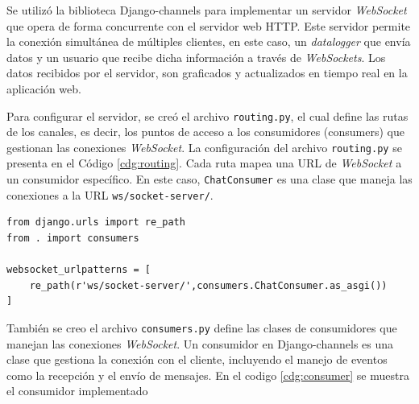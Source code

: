 Se utilizó la biblioteca Django-channels para implementar un servidor \textit{WebSocket} que opera de forma concurrente con el servidor web HTTP. Este servidor permite la conexión simultánea de múltiples clientes, en este caso, un \textit{datalogger} que envía datos y un usuario que recibe dicha información a través de \textit{WebSockets}. Los datos recibidos por el servidor, son graficados y actualizados en tiempo real en la aplicación web.

Para configurar el servidor, se creó el archivo \texttt{routing.py}, el cual define las rutas de los canales, es decir, los puntos de acceso a los consumidores (consumers) que gestionan las conexiones \textit{WebSocket}. La configuración del archivo \texttt{routing.py} se presenta en el Código \ref{cdg:routing}. Cada ruta mapea una URL de \textit{WebSocket} a un consumidor específico. En este caso, \texttt{ChatConsumer} es una clase que maneja las conexiones a la URL \texttt{ws/socket-server/}.



\begin{lstlisting}[style=pythonstyle, caption={Configuracion del routing para gestionar las conexiones de clientes al servidor \textit{WebSocket}.}, label=cdg:routing,basicstyle=\ttfamily\fontsize{8}{8}\selectfont]
from django.urls import re_path
from . import consumers

websocket_urlpatterns = [
    re_path(r'ws/socket-server/',consumers.ChatConsumer.as_asgi())
]
\end{lstlisting}

También se creo el archivo \texttt{consumers.py} define las clases de consumidores que manejan las conexiones \textit{WebSocket}. Un consumidor en Django-channels es una clase que gestiona la conexión con el cliente, incluyendo el manejo de eventos como la recepción y el envío de mensajes. En el codigo \ref{cdg:consumer} se muestra el consumidor implementado

